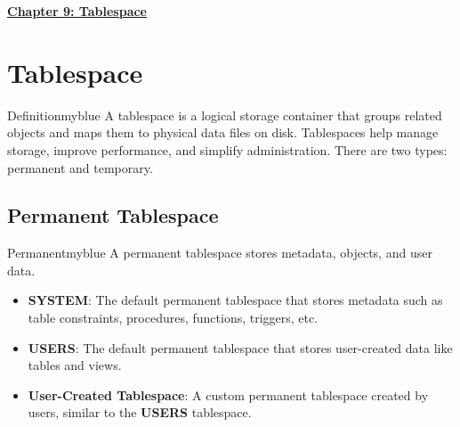 \newpage 
\null 
\vspace{0.15cm}

\begin{center} 
\Huge{\textbf{\underline{Chapter 9: Tablespace}}}
\end{center}

\vspace{0.25cm}

\setcounter{section}{0}

\vspace{1cm}

\section{Tablespace}
\begin{prettyBox}{Definition}{myblue}
A tablespace is a logical storage container that groups related objects 
and maps them to physical data files on disk. Tablespaces help manage storage, 
improve performance, and simplify administration. There are two types: permanent and temporary.
\end{prettyBox}

\vspace{0.25cm}

\subsection{Permanent Tablespace}
\begin{prettyBox}{Permanent}{myblue}
A permanent tablespace stores metadata, objects, and user data.
\begin{itemize}
    \item \textbf{SYSTEM}: The default permanent tablespace that stores 
          metadata such as table constraints, procedures, functions, triggers, etc.
    \item \textbf{USERS}: The default permanent tablespace that stores 
          user-created data like tables and views.
    \item \textbf{User-Created Tablespace}: A custom permanent tablespace 
          created by users, similar to the \textbf{USERS} tablespace.
\end{itemize}
\end{prettyBox}

\vspace{0.25cm}


